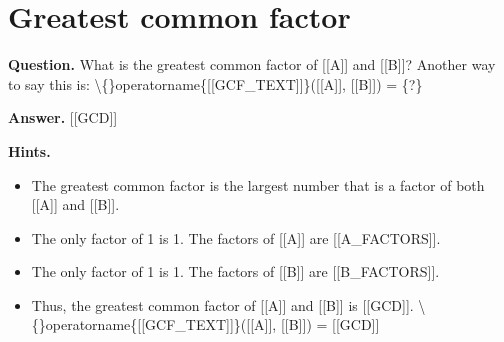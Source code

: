 \documentclass{article}
\begin{document}
\section*{Greatest common factor}
\textbf{Question.} What is the greatest common factor of [[A]] and [[B]]?
                    Another way to say this is: 
                    \textbackslash\{\}operatorname\{[[GCF\_TEXT]]\}([[A]], [[B]]) = \{?\}

\textbf{Answer.} [[GCD]]

\textbf{Hints.}
\begin{itemize}
  \item The greatest common factor is the largest number that is a factor of both [[A]] and [[B]].
  \item The only factor of 1 is 1.
                The factors of [[A]] are [[A\_FACTORS]].
  \item The only factor of 1 is 1.
                The factors of [[B]] are [[B\_FACTORS]].
  \item Thus, the greatest common factor of [[A]] and [[B]] is [[GCD]].
                \textbackslash\{\}operatorname\{[[GCF\_TEXT]]\}([[A]], [[B]]) = [[GCD]]
\end{itemize}
\end{document}
